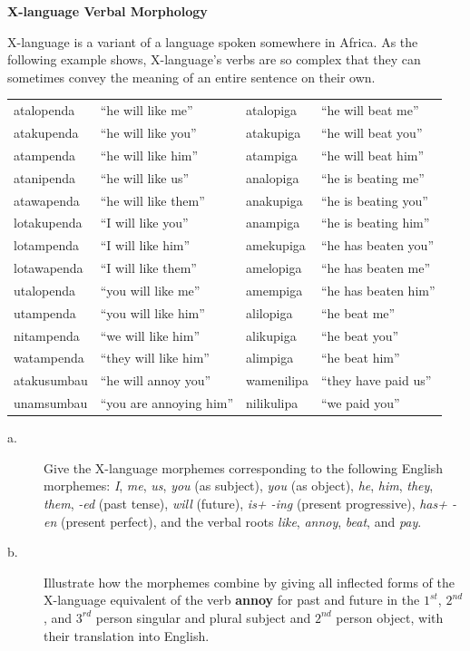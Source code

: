 \documentclass[11pt]{article}
\begin{document}
\begin{problem}{6}
\textbf{X-language Verbal Morphology}

X-language is a variant of a language spoken somewhere in Africa. As the following example shows, X-language's verbs are so complex that they can sometimes convey the meaning of an entire sentence on their own.

\begin{tabular}{l l | l l} 
\hline atalopenda & ``he will like me'' & atalopiga & ``he will beat me'' \\
atakupenda & ``he will like you'' & atakupiga & ``he will beat you'' \\
atampenda & ``he will like him'' & atampiga & ``he will beat him'' \\
atanipenda & ``he will like us'' & analopiga & ``he is beating me'' \\
atawapenda & ``he will like them'' & anakupiga & ``he is beating you'' \\
lotakupenda & ``I will like you'' & anampiga & ``he is beating him'' \\
lotampenda & ``I will like him'' & amekupiga & ``he has beaten you'' \\
lotawapenda & ``I will like them'' & amelopiga & ``he has beaten me'' \\
utalopenda & ``you will like me'' & amempiga & ``he has beaten him'' \\
utampenda & ``you will like him'' & alilopiga & ``he beat me'' \\
nitampenda & ``we will like him'' & alikupiga & ``he beat you'' \\
watampenda & ``they will like him'' & alimpiga & ``he beat him'' \\
atakusumbau & ``he will annoy you'' & wamenilipa & ``they have paid us'' \\
unamsumbau & ``you are annoying him'' & nilikulipa & ``we paid you'' \\ \hline
\end{tabular}

\begin{description}
	\item[a.] Give the X-language morphemes corresponding to the following English morphemes: \textit{I}, \textit{me}, \textit{us}, \textit{you} (as subject), \textit{you} (as object), \textit{he}, \textit{him}, \textit{they}, \textit{them}, \textit{-ed} (past tense), \textit{will} (future), \textit{is+ -ing} (present progressive), \textit{has+ -en} (present perfect), and the verbal roots \textit{like}, \textit{annoy}, \textit{beat}, and \textit{pay}.
	\item[b.] Illustrate how the morphemes combine by giving all inflected forms of the X-language equivalent of the verb \textbf{annoy} for past and future in the $1^{st}$, $2^{nd}$, and $3^{rd}$ person singular and plural subject and $2^{nd}$ person object, with their translation into English.
\end{description}

\end{problem}
\end{document}
